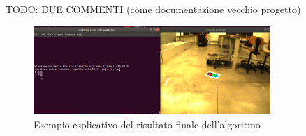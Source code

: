 TODO: DUE COMMENTI (come documentazione vecchio progetto)

\begin{figure}[H]
	\centering
	\includegraphics[width=0.8\textwidth]{Immagini/FinalResult.png}
	\caption{Esempio esplicativo del risultato finale dell'algoritmo}
	\label{fig:finalResult}
\end{figure}